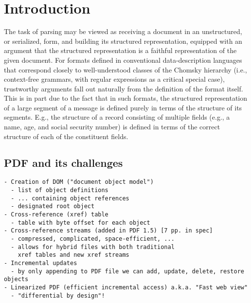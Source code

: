 \section{Introduction }
\label{sec:intro}
The task of parsing may be viewed as receiving a document in an
unstructured, or serialized, form, and building its structured
representation, equipped with an argument that the structured
representation is a faithful representation of the given document.
%
For formats defined in conventional data-description languages that
correspond closely to well-understood classes of the Chomsky hierarchy
(i.e., context-free grammars, with regular expressions as a critical
special case), trustworthy arguments fall out naturally from the
definition of the format itself.
%
This is in part due to the fact that in such formats, the structured
representation of a large segment of a message is defined purely in
terms of the structure of its segments.
%
E.g., the structure of a record consisting of multiple fields (e.g., a
name, age, and social security number) is defined in terms of the
correct structure of each of the constituent fields.





\subsection{PDF and its challenges}
\label{sec:pdf-challenges}

\begin{lstlisting}[style=meta]
- Creation of DOM ("document object model")
  - list of object definitions
  - ... containing object references
  - designated root object
- Cross-reference (xref) table
  - table with byte offset for each object
- Cross-reference streams (added in PDF 1.5) [7 pp. in spec]
  - compressed, complicated, space-efficient, ...
  - allows for hybrid files with both traditional
    xref tables and new xref streams
- Incremental updates
  - by only appending to PDF file we can add, update, delete, restore objects
- Linearized PDF (efficient incremental access) a.k.a. "Fast web view"
  - "differential by design"!
\end{lstlisting}

